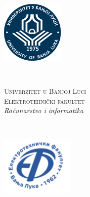 \begin{titlepage}
\begin{figure}
	\centering
	\begin{minipage}{.14\textwidth}
		\includegraphics[width=\linewidth]{logo.png}
	\end{minipage}~~
	\begin{minipage}{.6\textwidth}
		\centering
		\textsc{\large Univerzitet u Banjoj Luci}\\
		\textsc{\large Elektrotehnički fakultet}\\
		\large{\textit{Računarstvo i informatika}}
	\end{minipage}~~
	\begin{minipage}{.14\textwidth}
		\includegraphics[scale=0.8]{novi_logo.png}
	\end{minipage}
\end{figure}

\vspace{50mm}
~\\[7cm]


\end{titlepage}
